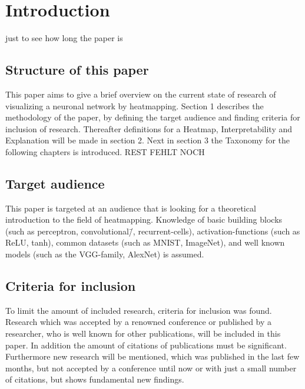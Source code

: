 \section{Introduction}
just to see how long the paper is

\subsection{Structure of this paper}
This paper aims to give a brief overview on the current state of research of visualizing a neuronal network by heatmapping. Section 1 describes the methodology of the paper, by defining the target audience and finding criteria for inclusion of research.
Thereafter definitions for a Heatmap, Interpretability and Explanation will be made in section 2. Next in section 3 the Taxonomy for the following chapters is introduced. REST FEHLT NOCH


\subsection{Target audience}
This paper is targeted at an audience that is looking for a theoretical introduction to the field of heatmapping. Knowledge of basic building blocks (such as perceptron, convolutional\=/, recurrent-cells), activation-functions (such as ReLU, tanh), common datasets (such as MNIST, ImageNet), and well known models (such as the VGG-family, AlexNet) is assumed.

\subsection{Criteria for inclusion}
To limit the amount of included research, criteria for inclusion was found. Research which was accepted by a renowned conference or published by a researcher, who is well known for other publications, will be included in this paper. In addition the amount of citations of publications must be significant. Furthermore new research will be mentioned, which was published in the last few months, but not accepted by a conference until now or with just a small number of citations, but shows fundamental new findings.